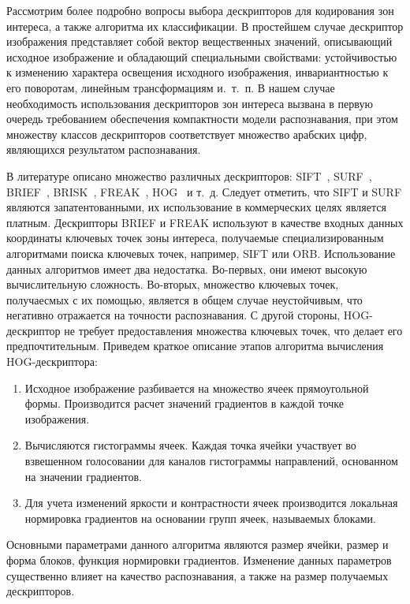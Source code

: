 Рассмотрим более подробно вопросы выбора дескрипторов
для кодирования зон интереса, а также алгоритма их классификации.
В простейшем случае дескриптор изображения представляет собой вектор
вещественных значений, описывающий исходное изображение и обладающий
специальными свойствами:
устойчивостью к изменению характера освещения исходного изображения,
инвариантностью к его поворотам, линейным трансформациям и.~т.~п.
В нашем случае необходимость использования дескрипторов зон интереса
вызвана в первую очередь требованием обеспечения компактности модели распознавания,
при этом множеству классов дескрипторов соответствует множество арабских цифр,
являющихся результатом распознавания.

В литературе описано множество различных дескрипторов:
SIFT~\cite{lowe04},
SURF~\cite{bay08},
BRIEF~\cite{calonder10},
BRISK~\cite{leutenegger11},
FREAK~\cite{ortiz12},
HOG~\cite{dalal05} и т.~д.
Следует отметить, что SIFT и SURF являются запатентованными,
их использование в коммерческих целях является платным.
Дескрипторы BRIEF и FREAK используют в качестве входных данных координаты
ключевых точек зоны интереса, получаемые специализированным алгоритмами
поиска ключевых точек, например, SIFT или ORB.
Использование данных алгоритмов имеет два недостатка.
Во-первых, они имеют высокую вычислительную сложность.
Во-вторых, множество ключевых точек, получаесмых с их помощью,
является в общем случае неустойчивым, что негативно отражается
на точности распознавания.
С другой стороны, HOG-дескриптор не требует предоставления множества
ключевых точек, что делает его предпочтительным.
Приведем краткое описание этапов алгоритма вычисления HOG-дескриптора:
\begin{enumerate}
\item Исходное изображение разбивается на множество ячеек прямоугольной формы.
  Производится расчет значений градиентов в каждой точке изображения.
\item Вычисляются гистограммы ячеек. Каждая точка ячейки участвует
  во взвешенном голосовании для каналов гистограммы направлений, основанном
  на значении градиентов.
\item Для учета изменений яркости и контрастности ячеек производится локальная
  нормировка градиентов на основании групп ячеек, называемых блоками.
\end{enumerate}

Основными параметрами данного алгоритма являются размер ячейки,
размер и форма блоков, функция нормировки градиентов. Изменение
данных параметров существенно влияет на качество распознавания,
а также на размер получаемых дескрипторов.

